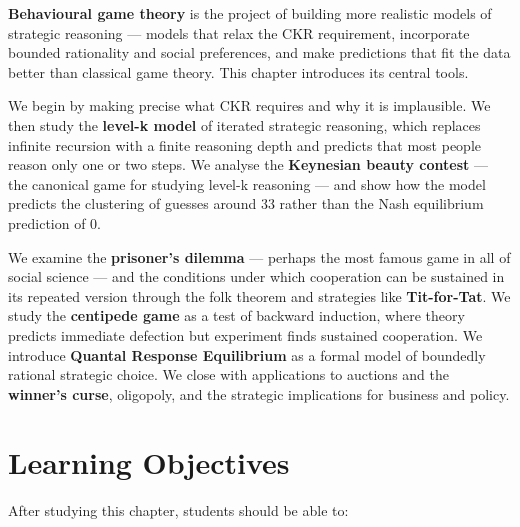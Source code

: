\documentclass[12pt, letterpaper]{article}
\begin{document}
\textbf{Behavioural game theory} is the project of building more realistic models of strategic reasoning --- models that relax the CKR requirement, incorporate bounded rationality and social preferences, and make predictions that fit the data better than classical game theory. This chapter introduces its central tools.

We begin by making precise what CKR requires and why it is implausible. We then study the \textbf{level-k model} of iterated strategic reasoning, which replaces infinite recursion with a finite reasoning depth and predicts that most people reason only one or two steps. We analyse the \textbf{Keynesian beauty contest} --- the canonical game for studying level-k reasoning --- and show how the model predicts the clustering of guesses around 33 rather than the Nash equilibrium prediction of 0.

We examine the \textbf{prisoner's dilemma} --- perhaps the most famous game in all of social science --- and the conditions under which cooperation can be sustained in its repeated version through the folk theorem and strategies like \textbf{Tit-for-Tat}. We study the \textbf{centipede game} as a test of backward induction, where theory predicts immediate defection but experiment finds sustained cooperation. We introduce \textbf{Quantal Response Equilibrium} as a formal model of boundedly rational strategic choice. We close with applications to auctions and the \textbf{winner's curse}, oligopoly, and the strategic implications for business and policy.

\medskip


\section*{Learning Objectives}


After studying this chapter, students should be able to:
\end{document}
